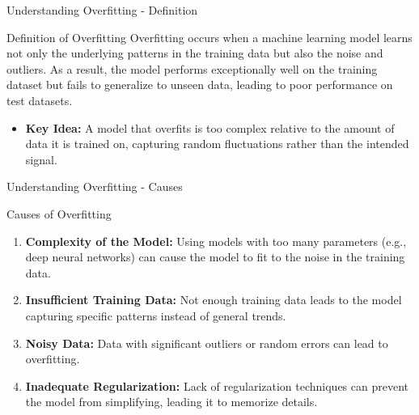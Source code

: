 \documentclass[aspectratio=169]{beamer}
\begin{document}
\begin{frame}[fragile]{Understanding Overfitting - Definition}
    \begin{block}{Definition of Overfitting}
        Overfitting occurs when a machine learning model learns not only the underlying patterns in the training data but also the noise and outliers. As a result, the model performs exceptionally well on the training dataset but fails to generalize to unseen data, leading to poor performance on test datasets.
    \end{block}
    \begin{itemize}
        \item \textbf{Key Idea:} A model that overfits is too complex relative to the amount of data it is trained on, capturing random fluctuations rather than the intended signal.
    \end{itemize}
\end{frame}

\begin{frame}[fragile]{Understanding Overfitting - Causes}
    \begin{block}{Causes of Overfitting}
        \begin{enumerate}
            \item \textbf{Complexity of the Model:} Using models with too many parameters (e.g., deep neural networks) can cause the model to fit to the noise in the training data.
            \item \textbf{Insufficient Training Data:} Not enough training data leads to the model capturing specific patterns instead of general trends.
            \item \textbf{Noisy Data:} Data with significant outliers or random errors can lead to overfitting.
            \item \textbf{Inadequate Regularization:} Lack of regularization techniques can prevent the model from simplifying, leading it to memorize details.
        \end{enumerate}
    \end{block}
\end{frame}
\end{document}
